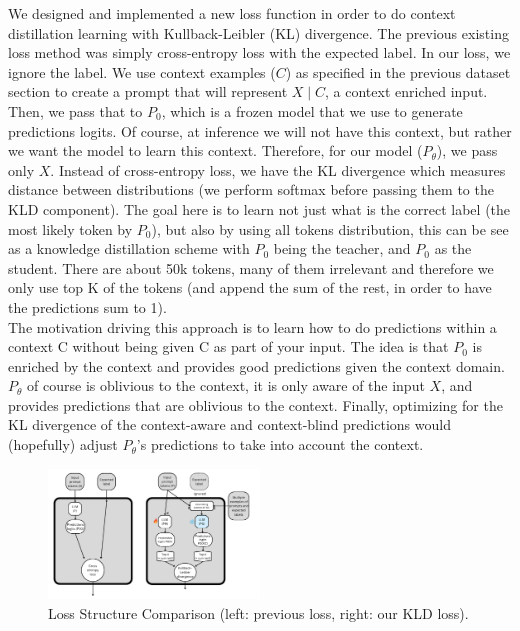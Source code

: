 \documentclass[10pt,twocolumn,letterpaper]{article}
\begin{document}
We designed and implemented a new loss function in order to do context distillation learning with Kullback-Leibler (KL) divergence. The previous existing loss method was simply cross-entropy loss with the expected label. In our loss, we ignore the label. We use context examples ($C$) as specified in the previous dataset section to create a prompt that will represent $X\mid C$, a context enriched input. Then, we pass that to $P_0$, which is a frozen model that we use to generate predictions logits. Of course, at inference we will not have this context, but rather we want the model to learn this context. Therefore, for our model ($P_\theta$), we pass only $X$. Instead of cross-entropy loss, we have the KL divergence which measures distance between distributions (we perform softmax before passing them to the KLD component).
The goal here is to learn not just what is the correct label (the most likely token by $P_0$), but also by using all tokens distribution, this can be see as a knowledge distillation scheme with $P_0$ being the teacher, and $P_0$ as the student. There are about 50k tokens, many of them irrelevant and therefore we only use top K of the tokens (and append the sum of the rest, in order to have the predictions sum to 1). \\
The motivation driving this approach is to learn how to do predictions within a context C without being given C as part of your input.
The idea is that $P_0$ is enriched by the context and provides good predictions given the context domain. 
$P_\theta$ of course is oblivious to the context, it is only aware of the input $X$,
and provides predictions that are oblivious to the context. Finally, optimizing for the KL divergence of the context-aware and context-blind predictions would (hopefully) adjust $P_\theta$’s predictions to take into account the context.


\begin{figure}[htbp]
   \centering
   \includegraphics[width=0.50\textwidth]{fig_1_loss_structure_comparison.png}
   \caption{Loss Structure Comparison (left: previous loss, right: our KLD loss).}
   \label{fig:your-label}
\end{figure}
\end{document}
